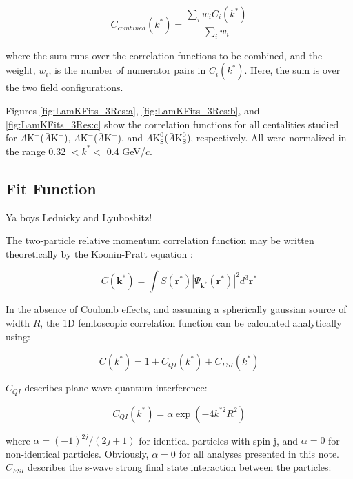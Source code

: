 \documentclass[ALICE,manyauthors]{cernphprep}
\newcommand{\LamKchPALamKchM}{$\Lambda\mathrm{K^{+}}$($\bar{\Lambda}\mathrm{K^{-}}$)\xspace}
\newcommand{\LamKchMALamKchP}{$\Lambda\mathrm{K^{-}}$($\bar{\Lambda}\mathrm{K^{+}}$)\xspace}
\newcommand{\LamKsALamKs}{$\Lambda\mathrm{K^{0}_{S}}$($\bar{\Lambda}\mathrm{K^{0}_{S}}$)\xspace}
\begin{document}
\begin{equation}
  C_{combined}(k^{*}) = \frac{\sum\limits_{i}w_{i}C_{i}(k^{*})}{\sum\limits_{i}w_{i}} 
\label{eqn:CombineCfs}
\end{equation}

where the sum runs over the correlation functions to be combined, and the weight, $w_{i}$, is the number of numerator pairs in $C_{i}(k^{*})$.
Here, the sum is over the two field configurations.

Figures \ref{fig:LamKFits_3Res:a}, \ref{fig:LamKFits_3Res:b}, and \ref{fig:LamKFits_3Res:c} show the correlation functions for all centalities studied for \LamKchPALamKchM, \LamKchMALamKchP, and \LamKsALamKs, respectively. All were normalized in the range 0.32 $< k^{*} < $ 0.4 GeV/$c$.


\subsection{Fit Function}
\label{sec:FitFunction}
Ya boys Lednicky and Lyuboshitz!

The two-particle relative momentum correlation function may be written theoretically by the Koonin-Pratt equation \cite{Koonin:1977fh, Pratt:1990zq}:

\begin{equation}
 C(\mathbf{k^{*}}) = \int S(\mathbf{r^{*}})|\Psi_{\mathbf{k^{*}}}(\mathbf{r^{*}})|^{2}d^{3}\mathbf{r^{*}}
\label{eqn:KooninPrattEqn}
\end{equation}

In the absence of Coulomb effects, and assuming a spherically gaussian source of width $R$, the 1D femtoscopic correlation function can be calculated analytically using:

\begin{equation}
 C(k^{*}) = 1 + C_{QI}(k^{*}) + C_{FSI}(k^{*})
\label{eqn:LednickyEqn}
\end{equation}

$C_{QI}$ describes plane-wave quantum interference:

\begin{equation}
 C_{QI}(k^{*}) = \alpha\exp(-4k^{*2}R^{2})
\label{eqn:CQI}
\end{equation}

where $\alpha = (-1)^{2j}/(2j+1)$ for identical particles with spin j, and $\alpha = 0$ for non-identical particles.  Obviously, $\alpha = 0$ for all analyses presented in this note.  $C_{FSI}$ describes the s-wave strong final state interaction between the particles:
\end{document}
